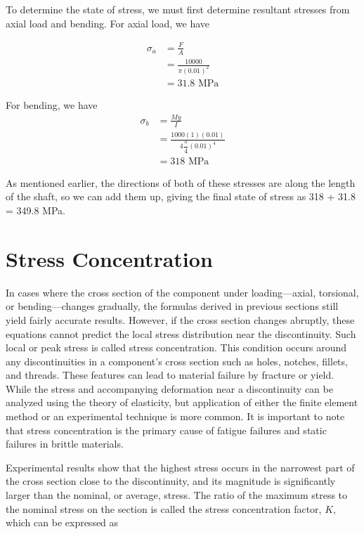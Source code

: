 \documentclass[a4paper,openany,12pt]{book}
\begin{document}
\hspace{2cm}

To determine the state of stress, we must first determine resultant
stresses from axial load and bending. For axial load, we have

$$\begin{aligned}
    \sigma_a &= \frac{F}{A} \\
             &= \frac{10000}{\pi (0.01)^2} \\
             &= 31.8 \text{ MPa}
  \end{aligned}$$

For bending, we have $$\begin{aligned}
    \sigma_b &= \frac{My}{I} \\
             &= \frac{1000(1)(0.01)}{4 \dfrac{\pi}{4}(0.01)^4} \\
             &= 318 \text{ MPa}
  \end{aligned}$$

As mentioned earlier, the directions of both of these stresses are along
the length of the shaft, so we can add them up, giving the final state
of stress as 318 + 31.8 = 349.8 MPa.

\section{Stress Concentration}
\label{stress-concentration}
In cases where the cross section of the component under loading---axial,
torsional, or bending---changes gradually, the formulas derived in
previous sections still yield fairly accurate results. However, if the
cross section changes abruptly, these equations cannot predict the local
stress distribution near the discontinuity. Such local or peak stress is
called stress concentration. This condition occurs around any
discontinuities in a component's cross section such as holes, notches,
fillets, and threads. These features can lead to material failure by
fracture or yield. While the stress and accompanying deformation near a
discontinuity can be analyzed using the theory of elasticity, but
application of either the finite element method or an experimental
technique is more common. It is important to note that stress
concentration is the primary cause of fatigue failures and static
failures in brittle materials.

Experimental results show that the highest stress occurs in the
narrowest part of the cross section close to the discontinuity, and its
magnitude is significantly larger than the nominal, or average, stress.
The ratio of the maximum stress to the nominal stress on the section is
called the stress concentration factor, \(K\), which can be expressed as
\end{document}
